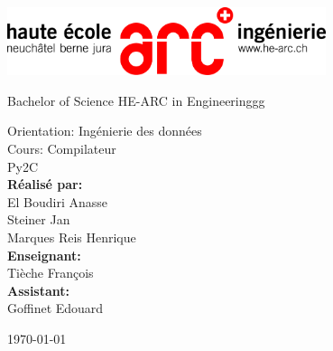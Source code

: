 \begin{titlepage}
    \fontsize{5cm}{10}%

    \begin{center}
        \includegraphics[width=0.7\textwidth]{./images/logos/he-arc-logo.png}
    \end{center}
    \vspace{1.3cm}

    \Huge Bachelor of Science HE-ARC in Engineeringgg
    \vspace{0,5cm}


    \large Orientation: Ingénierie des données\\[0.5cm]
    \vspace{0,5cm}
    \large Cours: Compilateur\\[0.5cm]
    {
    \Huge Py2C \\[1.5cm]
    }
    {
    \textbf{Réalisé par:}\\
    El Boudiri Anasse \\
    Steiner Jan \\
    Marques Reis Henrique\\
    }
    {
    \textbf{Enseignant:} \\
    Tièche François \\
    }
    {
    \textbf{Assistant:} \\
    Goffinet Edouard
    }
    \vfill

    {\today}

\end{titlepage}
